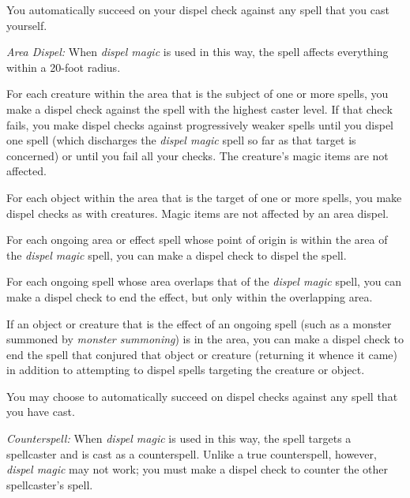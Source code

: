 You automatically succeed on your dispel check against any spell that you cast 
yourself.

\textit{Area Dispel:} When \textit{dispel magic} is used in this way, the spell 
affects everything within a 20-foot radius.

For each creature within the area that is the subject of one or more spells, you 
make a dispel check against the spell with the highest caster level. If that check 
fails, you make dispel checks against progressively weaker spells until you dispel 
one spell (which discharges the \textit{dispel magic} spell so far as that target 
is concerned) or until you fail all your checks. The creature's magic items are 
not affected.

For each object within the area that is the target of one or more spells, you make 
dispel checks as with creatures. Magic items are not affected by an area dispel.

For each ongoing area or effect spell whose point of origin is within the area 
of the \textit{dispel magic} spell, you can make a dispel check to dispel the spell.

For each ongoing spell whose area overlaps that of the \textit{dispel magic} spell, 
you can make a dispel check to end the effect, but only within the overlapping 
area.

If an object or creature that is the effect of an ongoing spell (such as a monster 
summoned by \textit{monster summoning}) is in the area, you can make a dispel check 
to end the spell that conjured that object or creature (returning it whence it 
came) in addition to attempting to dispel spells targeting the creature or object.

You may choose to automatically succeed on dispel checks against any spell that 
you have cast.

\textit{Counterspell:} When \textit{dispel magic} is used in this way, the spell 
targets a spellcaster and is cast as a counterspell. Unlike a true counterspell, 
however, \textit{dispel magic} may not work; you must make a dispel check to counter 
the other spellcaster's spell.

